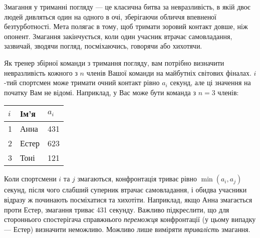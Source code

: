 

\noindent
Змагання у триманні погляду --- це класична битва за невразливість, в якій двоє людей дивляться один на одного в очі, зберігаючи обличчя впевненої безтурботності.
Мета полягає в тому, щоб тримати зоровий контакт довше, ніж опонент.
Змагання закінчується, коли один учасник втрачає самовладання, зазвичай, зводячи погляд, посміхаючись, говорячи або хихотячи.

Як тренер збірної команди з тримання погляду, вам потрібно визначити невразливість кожного з $n$ членів Вашої команди на майбутніх світових фіналах.
$i$-тий спортсмен може тримати очний контакт рівно $a_i$ секунд, але ці значення на початку Вам не відомі.
Наприклад, у Вас може бути команда з $n=3$ членів:

\medskip
\begin{tabular}{lll}
  $i$ & Ім'я & $a_i$\\\hline
  1 & Анна &  431 \\
  2 & Естер & 623 \\
  3 & Тоні &  121\\
\end{tabular}

\medskip
Коли спортсмени $i$ та $j$ змагаються, конфронтація триває рівно $\min(a_i, a_j)$ секунд, після чого слабший суперник втрачає самовладання, і обидва учасники відразу ж починають посміхатися та хихотіти.
Наприклад, якщо Анна змагається проти Естер, змагання триває 431 секунду.
Важливо підкреслити, що для стороннього спостерігача справжнього \emph{переможця} конфронтації (у цьому випадку --- Естер) визначити неможливо. Можливо лише виміряти \emph{тривалість} змагання.

